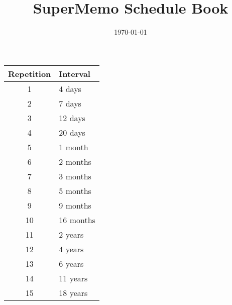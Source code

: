 \documentclass{article}
\newcommand\T{\rule{0pt}{2.6ex}}       %
\newcommand\B{\rule[-1.2ex]{0pt}{0pt}} %
\begin{document}
\title{SuperMemo Schedule Book}
\date{\today}
\maketitle

\begin{center}
\begin{tabular}{|c|l|}\hline
\textbf{Repetition} & \textbf{Interval} \\ \hline
\T\B 1 & 4 days \\ \hline
\T\B 2 & 7 days \\ \hline
\T\B 3 & 12 days \\ \hline
\T\B 4 & 20 days \\ \hline
\T\B 5 & 1 month \\ \hline
\T\B 6 & 2 months \\ \hline
\T\B 7 & 3 months \\ \hline
\T\B 8 & 5 months \\ \hline
\T\B 9 & 9 months \\ \hline
\T\B 10 & 16 months \\ \hline
\T\B 11 & 2 years \\ \hline
\T\B 12 & 4 years \\ \hline
\T\B 13 & 6 years \\ \hline
\T\B 14 & 11 years \\ \hline
\T\B 15 & 18 years \\ \hline
\end{tabular}
\end{center}
\end{document}
